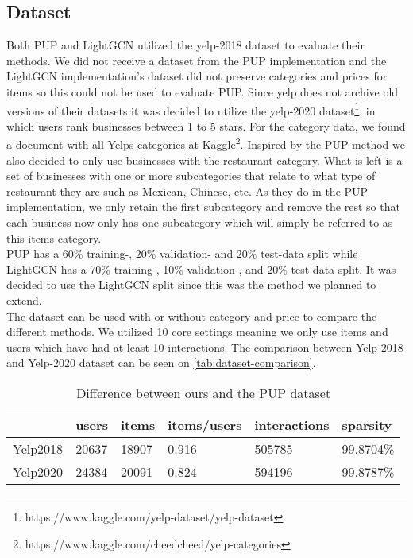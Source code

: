 \subsection{Dataset} \label{equal-data}
Both PUP and LightGCN utilized the yelp-2018 dataset to evaluate their methods.
We did not receive a dataset from the PUP implementation and the LightGCN implementation's dataset did not preserve categories and prices for items so this could not be used to evaluate PUP.
Since yelp does not archive old versions of their datasets it was decided to utilize the yelp-2020 dataset\footnote{https://www.kaggle.com/yelp-dataset/yelp-dataset}, in which users rank businesses between 1 to 5 stars.
For the category data, we found a document with all Yelps categories at Kaggle\footnote{https://www.kaggle.com/cheedcheed/yelp-categories}.
Inspired by the PUP method we also decided to only use businesses with the restaurant category.
What is left is a set of businesses with one or more subcategories that relate to what type of restaurant they are such as Mexican, Chinese, etc.
As they do in the PUP implementation, we only retain the first subcategory and remove the rest so that each business now only has one subcategory which will simply be referred to as this items category.
\\
PUP has a 60\% training-, 20\% validation- and 20\% test-data split while LightGCN has a 70\% training-, 10\% validation-, and 20\% test-data split.
It was decided to use the LightGCN split since this was the method we planned to extend.
\\
The dataset can be used with or without category and price to compare the different methods.
We utilized 10 core settings meaning we only use items and users which have had at least 10 interactions.
The comparison between Yelp-2018 and Yelp-2020 dataset can be seen on \autoref{tab:dataset-comparison}.
\begin{table*}[]
    \centering
    \begin{tabular}{|l|l|l|l|l|l|}
    \hline
                 & users & items & items/users & interactions & sparsity  \\ \hline
        Yelp2018 & 20637 & 18907 & 0.916       & 505785       & 99.8704\% \\ \hline
        Yelp2020 & 24384 & 20091 & 0.824       & 594196       & 99.8787\% \\ \hline
    \end{tabular}
    \caption{Difference between ours and the PUP dataset}
    \label{tab:dataset-comparison}
\end{table*}
